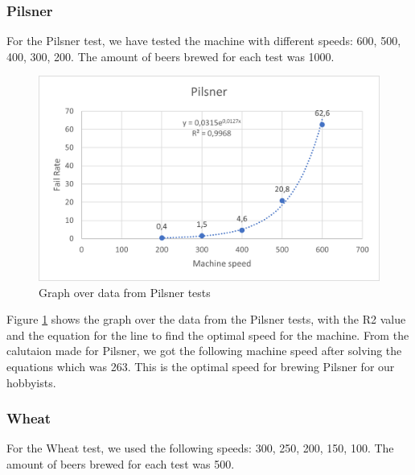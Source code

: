 \subsubsection{Pilsner}
For the Pilsner test, we have tested the machine with different speeds: 600, 500, 400, 300, 200. The amount of beers brewed for each test was 1000.

\begin{center}
    \centering
    \begin{figure}[H]
        \includegraphics[width=1\textwidth]{img/Pilsner_graph.png}
        \caption{Graph over data from Pilsner tests}
        \label{fig:Pilsner_graph}
    \end{figure}
\end{center}

Figure \ref{fig:Pilsner_graph} shows the graph over the data from the Pilsner tests, with the R2 value and the equation for the line to find the optimal speed for the machine. \newline
From the calutaion made for Pilsner, we got the following machine speed after solving the equations which was 263. This is the optimal speed for brewing Pilsner for our hobbyists. \newline

\subsubsection{Wheat}
For the Wheat test, we used the following speeds: 300, 250, 200, 150, 100. The amount of beers brewed for each test was 500.

